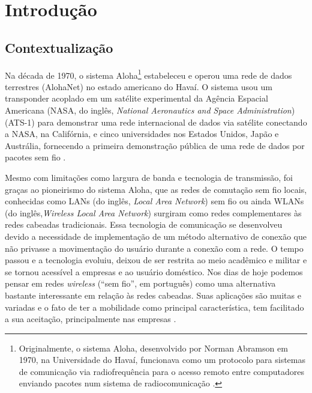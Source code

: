 \chapter{Introdução}
\label{cap:introducao}

\section{Contextualização}
\label{sec:contextualizacao}

Na década de 1970, o sistema Aloha\footnote{Originalmente, o sistema Aloha, desenvolvido por Norman Abramson em 1970, na Universidade do Havaí, funcionava como um protocolo para sistemas de comunicação via radiofrequência para o acesso remoto entre computadores enviando pacotes num sistema de radiocomunicação \cite{abramson1970acm,haykin2008}.} estabeleceu e operou uma rede de dados terrestres (AlohaNet) no estado americano do Havaí. O sistema usou um transponder acoplado em um satélite experimental da Agência Espacial Americana (NASA, do inglês, \textit{National Aeronautics and Space Administration}) (ATS-1) para demonstrar uma rede internacional de dados via satélite conectando a NASA, na Califórnia, e cinco universidades nos Estados Unidos, Japão e Austrália, fornecendo a primeira demonstração pública de uma rede de dados por pacotes sem fio \cite{abramson1970acm,SchwartzAbramson2009ieee}.

Mesmo com limitações como largura de banda e tecnologia de transmissão, foi graças ao pioneirismo do sistema Aloha, que as redes de comutação sem fio locais, conhecidas como LANs (do inglês, \textit{Local Area Network}) sem fio ou ainda WLANs (do inglês,\textit{Wireless Local Area Network}) surgiram como redes complementares às redes cabeadas tradicionais. Essa tecnologia de comunicação se desenvolveu devido a necessidade de implementação de um método alternativo de conexão que não privasse a movimentação do usuário durante a conexão com a rede. O tempo passou e a tecnologia evoluiu, deixou de ser restrita ao meio acadêmico e militar e se tornou acessível a empresas e ao usuário doméstico. Nos dias de hoje podemos pensar em redes \textit{wireless} (``sem fio'', em português) como uma alternativa bastante interessante em relação às redes cabeadas. Suas aplicações são muitas e variadas e o fato de ter a mobilidade como principal característica, tem facilitado a sua aceitação, principalmente nas empresas \cite{farias2005}.

